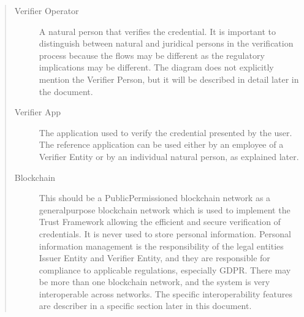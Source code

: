 \documentclass[a4paper,12pt,english,openany]{sphinxmanual}
\begin{document}
\begin{quote}
\begin{description}
\item[{Verifier Operator}] \leavevmode
\sphinxAtStartPar
A natural person that verifies the credential. It is important to distinguish between natural and juridical persons in the verification process because the flows may be different as the regulatory implications may be different. The diagram does not explicitly mention the Verifier Person, but it will be described in detail later in the document.

\item[{Verifier App}] \leavevmode
\sphinxAtStartPar
The application used to verify the credential presented by the user. The reference application can be used either by an employee of a Verifier Entity or by an individual natural person, as explained later.

\item[{Blockchain}] \leavevmode
\sphinxAtStartPar
This should be a Public\sphinxhyphen{}Permissioned blockchain network as a general\sphinxhyphen{}purpose blockchain network which is used to implement the Trust Framework allowing the efficient and secure verification of credentials. It is never used to store personal information. Personal information management is the responsibility of the legal entities Issuer Entity and Verifier Entity, and they are responsible for compliance to applicable regulations, especially GDPR. There may be more than one blockchain network, and the system is very interoperable across networks. The specific interoperability features are describer in a specific section later in this document.

\end{description}\end{quote}
\end{document}
